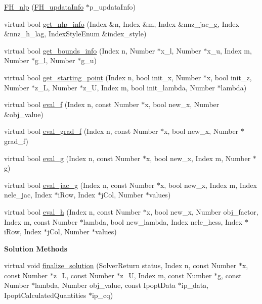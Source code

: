 \begin{DoxyCompactItemize}
\item 
\hyperlink{classquadruped_1_1FH__nlp_a2681be275f98fa7ca224ac7d03cf822e}{F\+H\+\_\+nlp} (\hyperlink{classquadruped_1_1FH__updataInfo}{F\+H\+\_\+updata\+Info} $\ast$p\+\_\+updata\+Info)
\item 
virtual bool \hyperlink{classquadruped_1_1FH__nlp_a2a7f67c823cce5ba75b8ba14a4beccfa}{get\+\_\+nlp\+\_\+info} (Index \&n, Index \&m, Index \&nnz\+\_\+jac\+\_\+g, Index \&nnz\+\_\+h\+\_\+lag, Index\+Style\+Enum \&index\+\_\+style)
\item 
virtual bool \hyperlink{classquadruped_1_1FH__nlp_a8f2ccc29742196f79b90ffd597b63927}{get\+\_\+bounds\+\_\+info} (Index n, Number $\ast$x\+\_\+l, Number $\ast$x\+\_\+u, Index m, Number $\ast$g\+\_\+l, Number $\ast$g\+\_\+u)
\item 
virtual bool \hyperlink{classquadruped_1_1FH__nlp_a97e90c5109ca64c20b27f767d5665df4}{get\+\_\+starting\+\_\+point} (Index n, bool init\+\_\+x, Number $\ast$x, bool init\+\_\+z, Number $\ast$z\+\_\+L, Number $\ast$z\+\_\+U, Index m, bool init\+\_\+lambda, Number $\ast$lambda)
\item 
virtual bool \hyperlink{classquadruped_1_1FH__nlp_a1c50f2e5601d9cfadf569d7dae7ba787}{eval\+\_\+f} (Index n, const Number $\ast$x, bool new\+\_\+x, Number \&obj\+\_\+value)
\item 
virtual bool \hyperlink{classquadruped_1_1FH__nlp_aace436330eee6fd6e4e86ec2221a8a35}{eval\+\_\+grad\+\_\+f} (Index n, const Number $\ast$x, bool new\+\_\+x, Number $\ast$grad\+\_\+f)
\item 
virtual bool \hyperlink{classquadruped_1_1FH__nlp_a6451ea1ebe787cc94fe34199193c7acd}{eval\+\_\+g} (Index n, const Number $\ast$x, bool new\+\_\+x, Index m, Number $\ast$g)
\item 
virtual bool \hyperlink{classquadruped_1_1FH__nlp_adc432f17a942b28d5cd9ac261361692d}{eval\+\_\+jac\+\_\+g} (Index n, const Number $\ast$x, bool new\+\_\+x, Index m, Index nele\+\_\+jac, Index $\ast$i\+Row, Index $\ast$j\+Col, Number $\ast$values)
\item 
virtual bool \hyperlink{classquadruped_1_1FH__nlp_a19a232662e043d038b3184ccac74e679}{eval\+\_\+h} (Index n, const Number $\ast$x, bool new\+\_\+x, Number obj\+\_\+factor, Index m, const Number $\ast$lambda, bool new\+\_\+lambda, Index nele\+\_\+hess, Index $\ast$i\+Row, Index $\ast$j\+Col, Number $\ast$values)
\end{DoxyCompactItemize}
\begin{Indent}\textbf{ Solution Methods}\par
\begin{DoxyCompactItemize}
\item 
virtual void \hyperlink{classquadruped_1_1FH__nlp_aae99a7bb4a2e1eb7fee96440583fae95}{finalize\+\_\+solution} (Solver\+Return status, Index n, const Number $\ast$x, const Number $\ast$z\+\_\+L, const Number $\ast$z\+\_\+U, Index m, const Number $\ast$g, const Number $\ast$lambda, Number obj\+\_\+value, const Ipopt\+Data $\ast$ip\+\_\+data, Ipopt\+Calculated\+Quantities $\ast$ip\+\_\+cq)
\end{DoxyCompactItemize}
\end{Indent}

